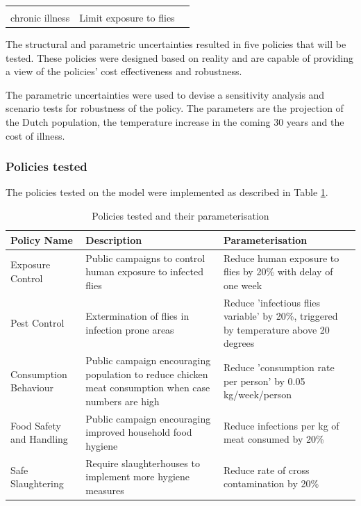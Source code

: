 \begin{longtable}[]{l|l|l}
                               & \begin{tabular}[c]{@{}l@{}}Proportion of people developing \\ chronic illness\end{tabular} & Limit exposure to flies                                                                                     \\ \hline
\end{longtable}

The structural and parametric uncertainties resulted in five policies that will be tested. These policies were designed based on reality and are capable of providing a view of the policies' cost effectiveness and robustness. 

The parametric uncertainties were used to devise a sensitivity analysis and scenario tests for robustness of the policy. The parameters are the projection of the Dutch population, the temperature increase in the coming 30 years and the cost of illness. 

\subsubsection{Policies tested}

The policies tested on the model were implemented as described in Table \ref{tab:policies}.

\begin{table}[h!]
\centering
\caption{Policies tested and their parameterisation}
\begin{tabular}{ l  p{3.8cm}  p{3.8cm}}
\hline
Policy Name &
   Description &
  Parameterisation \\ \hline
Exposure Control &
  Public campaigns to control human exposure to infected flies &
  Reduce human exposure to flies by 20\% with delay of one week \\
Pest Control &
  Extermination of flies in infection prone areas &
  Reduce 'infectious flies variable' by 20\%, triggered by temperature above 20 degrees \\
Consumption Behaviour &
  Public campaign encouraging population to reduce chicken meat consumption when case numbers are high &
  Reduce 'consumption rate per person' by 0.05 kg/week/person \\
Food Safety and Handling &
  Public campaign encouraging improved household food hygiene &
  Reduce infections per kg of meat consumed by 20\% \\
Safe Slaughtering &
  Require slaughterhouses to implement more hygiene measures &
  Reduce rate of cross contamination by 20\% \\ \hline
\end{tabular}
\label{tab:policies}
\end{table}

